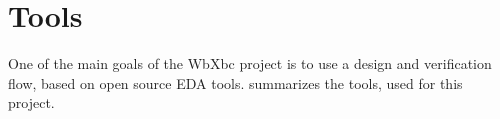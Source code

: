 
\section{Tools}
\label{tools}

One of the main goals of the WbXbc project is to use a design and verification flow,
based on open source EDA tools.  summarizes the tools, used for
this project. 

